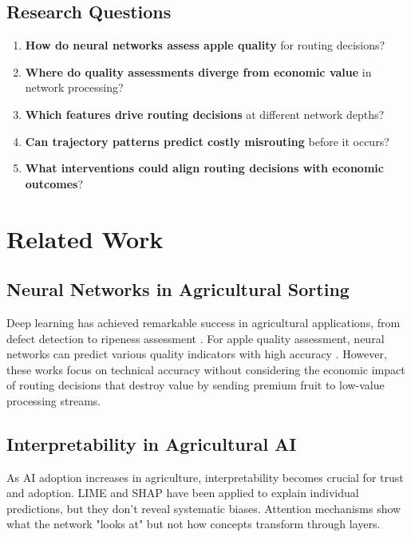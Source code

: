 \documentclass[11pt,a4paper]{article}
\begin{document}
\subsection{Research Questions}

\begin{enumerate}
    \item \textbf{How do neural networks assess apple quality} for routing decisions?
    \item \textbf{Where do quality assessments diverge from economic value} in network processing?
    \item \textbf{Which features drive routing decisions} at different network depths?
    \item \textbf{Can trajectory patterns predict costly misrouting} before it occurs?
    \item \textbf{What interventions could align routing decisions with economic outcomes}?
\end{enumerate}

\section{Related Work}

\subsection{Neural Networks in Agricultural Sorting}

Deep learning has achieved remarkable success in agricultural applications, from defect detection \citep{chen2021} to ripeness assessment \citep{kumar2023}. For apple quality assessment, neural networks can predict various quality indicators with high accuracy \citep{park2022}. However, these works focus on technical accuracy without considering the economic impact of routing decisions that destroy value by sending premium fruit to low-value processing streams.

\subsection{Interpretability in Agricultural AI}

As AI adoption increases in agriculture, interpretability becomes crucial for trust and adoption. LIME and SHAP have been applied to explain individual predictions, but they don't reveal systematic biases. Attention mechanisms show what the network "looks at" but not how concepts transform through layers.
\end{document}
